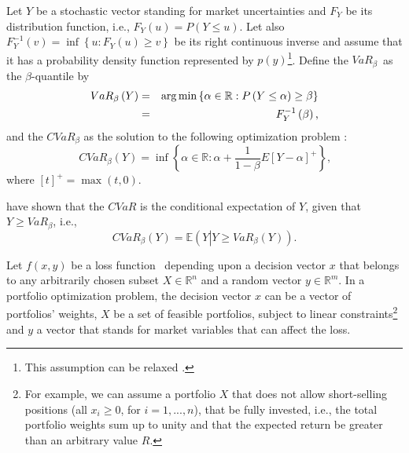 \documentclass[a4paper,10pt]{article}
\begin{document}
Let $Y$ be a stochastic vector standing for market uncertainties and $F_{Y}$
be its distribution function, i.e., $F_{Y}\left( u\right) =P\left( Y\leq
u\right) $. Let also $F_{Y}^{-1}\left( v\right) =\inf \left\{ u:F_{Y}\left(
u\right) \geq v\right\} $ be its right continuous inverse and assume that it
has a probability density function represented by $p(y)$\footnote{%
	This assumption can be relaxed \citep{uryasev2013}.}. Define the $VaR_{\beta
}$\thinspace\ as the $\beta $-quantile by
\begin{eqnarray}
VaR_{\beta }\left( Y\right) &=& \arg \min \left\{ \alpha \in
\mathbb{R}
:P\left( Y\leq \alpha \right) \geq \beta \right\}  \label{one} \\
&=&F_{Y}^{-1}\left( \beta \right) \text{,}  \notag
\end{eqnarray}%
and the $CVaR_{\beta }$ as the solution to the following optimization
problem \citep{pflug2000}:
\begin{equation}
CVaR_{\beta }\left( Y\right) =\inf \left\{ \alpha \in
\mathbb{R}
:\alpha +\frac{1}{1-\beta }E\left[ Y-\alpha \right] ^{+}\right\} \text{,}
\label{two}
\end{equation}%
where $\left[ t\right] ^{+}=\max \left( t,0\right) $.

\bigskip \citet*{uryasev1999} have shown that the $CVaR$ is the conditional
expectation of $Y$, given that $Y\geq VaR_{\beta }$, i.e.,
\begin{equation}
CVaR_{\beta }\left( Y\right) =\mathbb{E}\left( Y\left\vert Y\geq VaR_{\beta
}\left( Y\right) \right. \right) .  \label{three}
\end{equation}

Let $f\left( x,y\right) $ be a loss function \ depending upon a decision
vector $x$ that belongs to any arbitrarily chosen subset $X\in
\mathbb{R}
^{n}$ and a random vector $y\in
\mathbb{R}
^{m}$. In a portfolio optimization problem, the decision vector $x$ can be a
vector of portfolios' weights, $X$ be a set of feasible portfolios,
subject to linear constraints\footnote{%
	For example, we can assume a portfolio $X$ that does not allow short-selling positions (all $x_{i}\geq 0$, for $i=1,...,n$),
	that be fully invested, i.e., the total portfolio weights sum
	up to unity and that the expected return be greater than an arbitrary value $%
	R$.} and $y$ a vector that stands for market variables that can affect the loss.
\end{document}
